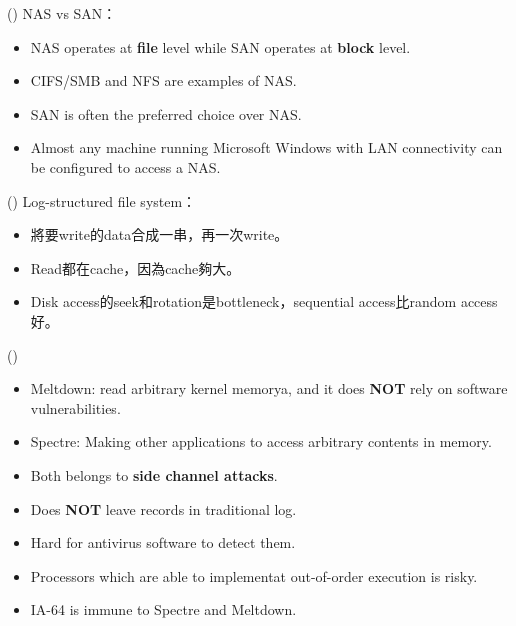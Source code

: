 \item \begin{theorem}{()} NAS vs SAN： \begin{itemize}
        \item NAS operates at \textbf{file} level while SAN operates at \textbf{block} level.
        \item CIFS/SMB and NFS are examples of NAS.
        \item SAN is often the preferred choice over NAS.
        \item Almost any machine running Microsoft Windows with LAN connectivity can be configured to access a NAS.
    \end{itemize}
\end{theorem}

\item \begin{theorem}{()} Log-structured file system： \begin{itemize}
        \item 將要write的data合成一串，再一次write。
        \item Read都在cache，因為cache夠大。
        \item Disk access的seek和rotation是bottleneck，sequential access比random access好。
    \end{itemize}
\end{theorem}

\item \begin{theorem}{()} \quad\quad \begin{itemize}
        \item Meltdown: read arbitrary kernel memorya, and it does \textbf{NOT} rely on software vulnerabilities.
        \item Spectre: Making other applications to access arbitrary contents in memory.
        \item Both belongs to \textbf{side channel attacks}.
        \item Does \textbf{NOT} leave records in traditional log.
        \item Hard for antivirus software to detect them.
        \item Processors which are able to implementat out-of-order execution is risky.
        \item IA-64 is immune to Spectre and Meltdown. 
    \end{itemize}
\end{theorem}

